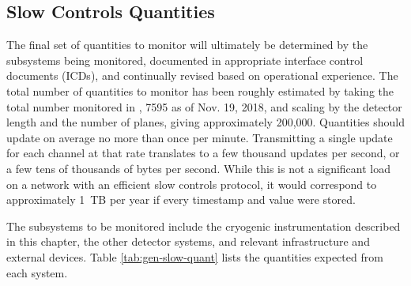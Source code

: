 \subsection{Slow Controls Quantities}
\label{sec:fdgen-slow-cryo-quant}


The final set of quantities to monitor will ultimately be determined
by the subsystems being monitored, documented in
appropriate  interface control documents (ICDs), and continually revised based on operational
experience.  The total number of quantities to monitor has been roughly estimated by taking the total number monitored
in \cite{pdspdcs_proc}, 7595 as of Nov. 19, 2018, and scaling by the detector length and the number of planes, giving approximately 200,000. %
Quantities should update on average no more than once per minute.
Transmitting a single update for each channel at that rate translates to a few thousand updates per second, or a few tens of thousands of bytes per second. While this is not a significant load on a network with an efficient slow controls protocol, it would correspond to approximately 1~TB per year if every timestamp and value were stored.

The subsystems
to be monitored include the %
cryogenic instrumentation
described in this chapter, the other detector systems, and relevant
infrastructure and external devices. Table \ref{tab:gen-slow-quant}
lists the quantities expected from each system.

